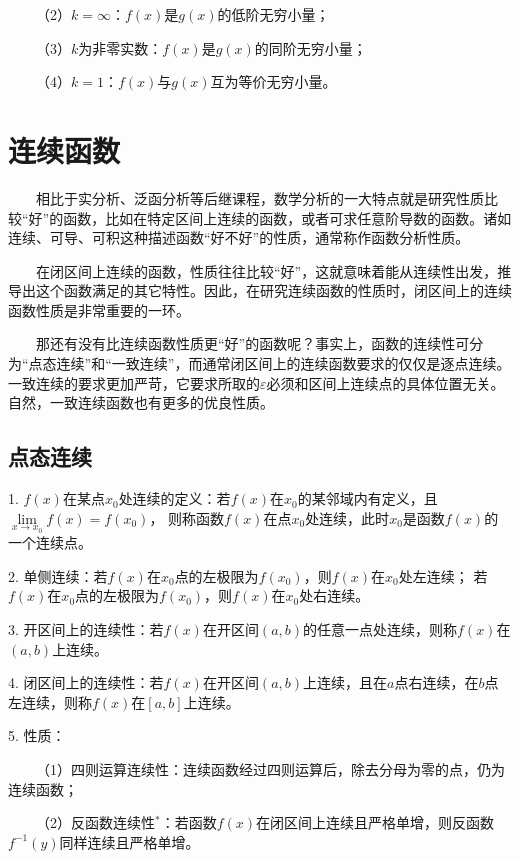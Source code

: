 ~~~~（2）$k=\infty$：$f(x)$是$g(x)$的低阶无穷小量；

~~~~（3）$k$为非零实数：$f(x)$是$g(x)$的同阶无穷小量；

~~~~（4）$k=1$：$f(x)$与$g(x)$互为等价无穷小量。

\section{连续函数}

\begin{tcolorbox}[colback=red!5,colframe=red!75!black]
    ~~~~相比于实分析、泛函分析等后继课程，数学分析的一大特点就是研究性质比较“好”的函数，比如在特定区间上连续的函数，或者可求任意阶导数的函数。诸如连续、可导、可积这种描述函数“好不好”的性质，通常称作函数分析性质。

    ~~~~在闭区间上连续的函数，性质往往比较“好”，这就意味着能从连续性出发，推导出这个函数满足的其它特性。因此，在研究连续函数的性质时，闭区间上的连续函数性质是非常重要的一环。

    ~~~~那还有没有比连续函数性质更“好”的函数呢？事实上，函数的连续性可分为“点态连续”和“一致连续”，而通常闭区间上的连续函数要求的仅仅是逐点连续。一致连续的要求更加严苛，它要求所取的$\varepsilon$必须和区间上连续点的具体位置无关。
    自然，一致连续函数也有更多的优良性质。

\end{tcolorbox}

\subsection{点态连续}

1. $f(x)$在某点$x_0$处连续的定义：若$f(x)$在$x_0$的某邻域内有定义，且$\lim\limits_{x\rightarrow x_0}f(x)=f(x_0)$，
则称函数$f(x)$在点$x_0$处连续，此时$x_0$是函数$f(x)$的一个连续点。

2. 单侧连续：若$f(x)$在$x_0$点的左极限为$f(x_0)$，则$f(x)$在$x_0$处左连续；
若$f(x)$在$x_0$点的左极限为$f(x_0)$，则$f(x)$在$x_0$处右连续。

3. 开区间上的连续性：若$f(x)$在开区间$(a,b)$的任意一点处连续，则称$f(x)$在$(a,b)$上连续。

4. 闭区间上的连续性：若$f(x)$在开区间$(a,b)$上连续，且在$a$点右连续，在$b$点左连续，则称$f(x)$在$[a,b]$上连续。

5. 性质：

~~~~（1）四则运算连续性：连续函数经过四则运算后，除去分母为零的点，仍为连续函数；

~~~~（2）反函数连续性$^*$：若函数$f(x)$在闭区间上连续且严格单增，则反函数$f^{-1}(y)$同样连续且严格单增。

